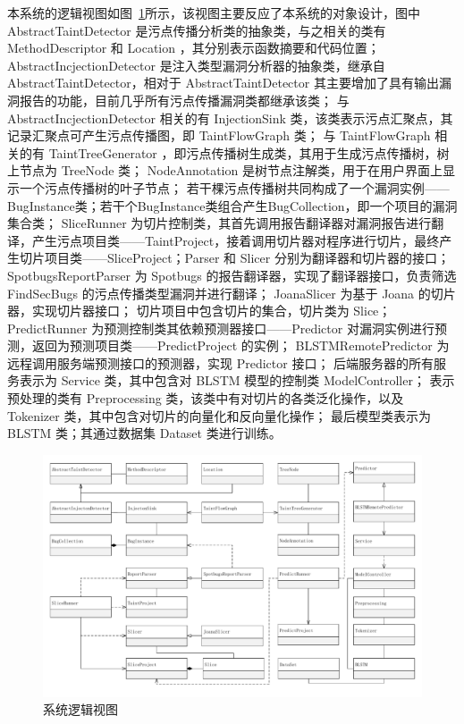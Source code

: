 本系统的逻辑视图如图~\ref{view:logic}所示，该视图主要反应了本系统的对象设计，图中 AbstractTaintDetector 是污点传播分析类的抽象类，与之相关的类有MethodDescriptor 和 Location ，其分别表示函数摘要和代码位置；
AbstractIncjectionDetector 是注入类型漏洞分析器的抽象类，继承自 AbstractTaintDetector，相对于 AbstractTaintDetector 其主要增加了具有输出漏洞报告的功能，目前几乎所有污点传播漏洞类都继承该类；
与 AbstractIncjectionDetector 相关的有 InjectionSink 类，该类表示污点汇聚点，其记录汇聚点可产生污点传播图，即 TaintFlowGraph 类；
与 TaintFlowGraph 相关的有 TaintTreeGenerator ，即污点传播树生成类，其用于生成污点传播树，树上节点为 TreeNode 类；
NodeAnnotation 是树节点注解类，用于在用户界面上显示一个污点传播树的叶子节点；
若干棵污点传播树共同构成了一个漏洞实例——BugInstance类；若干个BugInstance类组合产生BugCollection，即一个项目的漏洞集合类；
SliceRunner 为切片控制类，其首先调用报告翻译器对漏洞报告进行翻译，产生污点项目类——TaintProject，接着调用切片器对程序进行切片，最终产生切片项目类——SliceProject；Parser 和 Slicer 分别为翻译器和切片器的接口；
SpotbugsReportParser 为 Spotbugs 的报告翻译器，实现了翻译器接口，负责筛选 FindSecBugs 的污点传播类型漏洞并进行翻译；
JoanaSlicer 为基于 Joana 的切片器，实现切片器接口；
切片项目中包含切片的集合，切片类为 Slice；
PredictRunner 为预测控制类其依赖预测器接口——Predictor 对漏洞实例进行预测，返回为预测项目类——PredictProject 的实例；
BLSTMRemotePredictor 为远程调用服务端预测接口的预测器，实现 Predictor 接口；
后端服务器的所有服务表示为 Service 类，其中包含对 BLSTM 模型的控制类 ModelController；
表示预处理的类有 Preprocessing 类，该类中有对切片的各类泛化操作，以及 Tokenizer 类，其中包含对切片的向量化和反向量化操作；
最后模型类表示为 BLSTM 类；其通过数据集 Dataset 类进行训练。

\begin{figure}[!htb]
	\centering
	\includegraphics[width=5in]{FIGs/chapter3/viewlogic.pdf}
	\caption{系统逻辑视图}\label{view:logic}
\end{figure}

